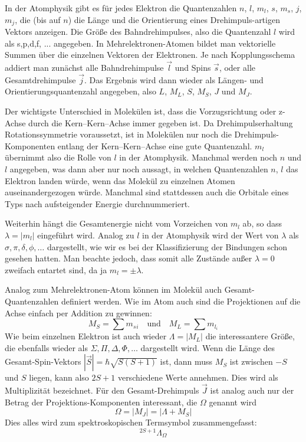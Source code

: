 In der Atomphysik gibt es für jedes Elektron die Quantenzahlen $n$, $l$, $m_l$, $s$, $m_s$, $j$, $m_j$, die (bis auf $n$) die Länge und die Orientierung eines Drehimpuls-artigen Vektors anzeigen. Die Größe des Bahndrehimpulses, also die 
Quantenzahl $l$ wird als s,p,d,f, ... angegeben. In Mehrelektronen-Atomen bildet man vektorielle Summen über die einzelnen Vektoren der Elektronen. Je nach Kopplungsschema addiert
man zunächst alle Bahndrehimpulse $\vec{l}$ und Spins $\vec{s}$, oder alle Gesamtdrehimpulse $\vec{j}$. Das Ergebnis wird dann wieder als Längen- und Orientierungsquantenzahl angegeben, also $L$, $M_L$, $S$, $M_S$, $J$ und $M_J$.


Der wichtigste Unterschied in Molekülen ist, dass die Vorzugsrichtung oder z-Achse durch die Kern--Kern--Achse immer gegeben ist. Da Drehimpulserhaltung Rotationssymmetrie voraussetzt, ist in Molekülen nur noch die Drehimpuls-Komponenten entlang der Kern--Kern--Achse eine gute Quantenzahl. $m_l$ übernimmt also die Rolle von $l$ in der Atomphysik. Manchmal werden noch $n$ und  $l$  angegeben, was dann  aber nur noch aussagt, in welchen Quantenzahlen $n$, $l$ das Elektron landen würde, wenn das Molekül zu einzelnen Atomen auseinandergezogen würde. Manchmal sind stattdessen auch die Orbitale eines Typs nach aufsteigender Energie durchnummeriert.

Weiterhin hängt die Gesamtenergie nicht vom Vorzeichen von $m_l$ ab, so dass $\lambda = | m_l | $ eingeführt wird. Analog zu $l$ in der Atomphysik wird der Wert von $\lambda$ als $\sigma, \pi, \delta, \phi, \dots$ dargestellt, wie wir es bei der Klassifizierung der Bindungen schon gesehen hatten. Man beachte jedoch, dass somit alle Zustände außer $\lambda = 0$ zweifach entartet sind, da ja $m_l = \pm \lambda$.


Analog zum Mehrelektronen-Atom können im Molekül auch Gesamt-Quantenzahlen definiert werden. Wie im Atom auch sind die Projektionen auf die Achse einfach per Addition zu gewinnen:
\begin{equation}
M_S = \sum m_s{_i} \quad \text{und} \quad M_L  = \sum m_{l_i}
\end{equation}
Wie beim einzelnen Elektron ist auch wieder $\Lambda = | M_L|$ die interessantere Größe, die ebenfalls wieder als $\Sigma, \Pi, \Delta, \Phi, \dots$ dargestellt wird. Wenn die Länge des Gesamt-Spin-Vektors $|\vec{S}| = \hbar \sqrt{S (S+1)}$ ist, dann muss  $M_S$ ist zwischen $-S$ und $S$ liegen, kann also  $2S + 1$  verschiedene Werte annehmen. Dies wird als Multiplizität bezeichnet. Für den Gesamt-Drehimpuls $\vec{J}$ ist analog auch nur der Betrag der Projektions-Komponenten interessant, die $\Omega$ genannt wird
\begin{equation}
 \Omega = | M_J | = | \Lambda + M_S|
\end{equation}
Dies alles wird zum spektroskopischen Termsymbol zusammengefasst:
\begin{equation}
 ^{2 S + 1}\Lambda_\Omega
\end{equation}


